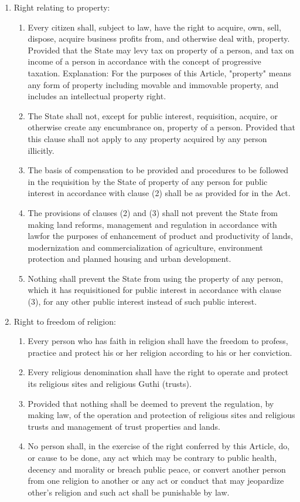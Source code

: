 \begin{questions}
\begin{solution}
\begin{enumerate}
\item Right relating to property:
\begin{enumerate}
    \item Every citizen shall, subject to law, have the right to acquire, own, sell, dispose, acquire business profits from, and otherwise deal with, property. Provided that the State may levy tax on property of a person, and tax on income of a person in accordance with the concept of progressive taxation. Explanation: For the purposes of this Article, "property" means any form of property including movable and immovable property, and includes an intellectual property right.
    \item The State shall not, except for public interest, requisition, acquire, or otherwise create any encumbrance on, property of a person. Provided that this clause shall not apply to any property acquired by any person illicitly.
    \item The basis of compensation to be provided and procedures to be followed in the requisition by the State of property of any person for public interest in accordance with clause (2) shall be as provided for in the Act.
    \item The provisions of clauses (2) and (3) shall not prevent the State from making land reforms, management and regulation in accordance with lawfor the purposes of enhancement of product and productivity of lands, modernization and commercialization of agriculture, environment protection and planned housing and urban development.
    \item Nothing shall prevent the State from using the property of any person, which it has requisitioned for public interest in accordance with clause (3), for any other public interest instead of such public interest.
\end{enumerate}

\item Right to freedom of religion: 
\begin{enumerate}
    \item Every person who has faith in religion shall have the freedom to profess, practice and protect his or her religion according to his or her conviction.
    \item Every religious denomination shall have the right to operate and protect its religious sites and religious Guthi (trusts).
    \item[] Provided that nothing shall be deemed to prevent the regulation, by making law, of the operation and protection of religious sites and religious trusts and management of trust properties and lands.
    \item No person shall, in the exercise of the right conferred by this Article, do, or cause to be done, any act which may be contrary to public health, decency and morality or breach public peace, or convert another person from one religion to another or any act or conduct that may jeopardize other's religion and such act shall be punishable by law.
\end{enumerate}


\end{enumerate}
\end{solution}
\end{questions}

